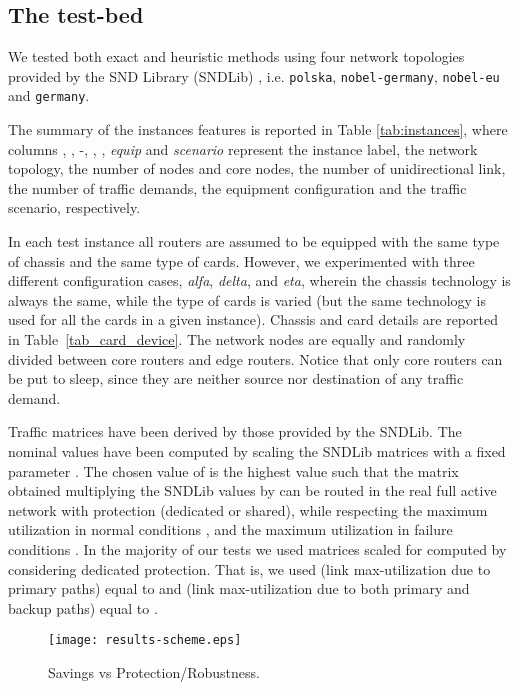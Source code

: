 \documentclass[final,5p,times,twocolumn]{elsarticle}
\begin{document}
\subsection{The test-bed}\label{sec:testbed} We tested both exact and heuristic methods using four network topologies provided by the SND Library (SNDLib) \cite{orlowski10}, i.e. {\tt polska}, {\tt nobel-germany}, {\tt nobel-eu} and {\tt germany}. 

The summary of the instances features is reported in Table \ref{tab:instances}, where columns , , -, , , \textit{equip} and \textit{scenario} represent the instance label, the network topology, the number of nodes and core nodes, the number of unidirectional link, the number of traffic demands, the equipment configuration and the traffic scenario, respectively.

In each test instance all routers are assumed to be equipped with the same type of chassis and the same type of cards. However, we experimented with three different configuration cases, \textit{alfa}, \textit{delta}, and \textit{eta}, wherein the chassis technology is always the same, while the type of cards is varied (but the same technology is used for all the cards in a given instance). Chassis and card details are reported in Table~\ref{tab_card_device}. The network nodes are equally and randomly divided between core routers and edge routers. Notice that only core routers can be put to sleep, since they are neither source nor destination of any traffic demand. 

Traffic matrices have been derived by those provided by the SNDLib. The nominal values  have been computed by scaling the SNDLib matrices with a fixed parameter . The chosen value of  is the highest value such that the matrix obtained multiplying the SNDLib values by  can be routed in the real full active network with protection (dedicated or shared), while respecting the maximum utilization in normal conditions , and the maximum utilization in failure conditions . In the majority of our tests we used matrices scaled for  computed by considering dedicated protection. That is, we used  (link max-utilization due to primary paths) equal to  and   (link max-utilization due to both primary and backup paths) equal to . 

\begin{figure*}[!th]\centering
  \texttt{[image: results-scheme.eps]}
  \caption{Savings vs Protection/Robustness.}
\label{fig:scheme}
\end{figure*}
\end{document}
